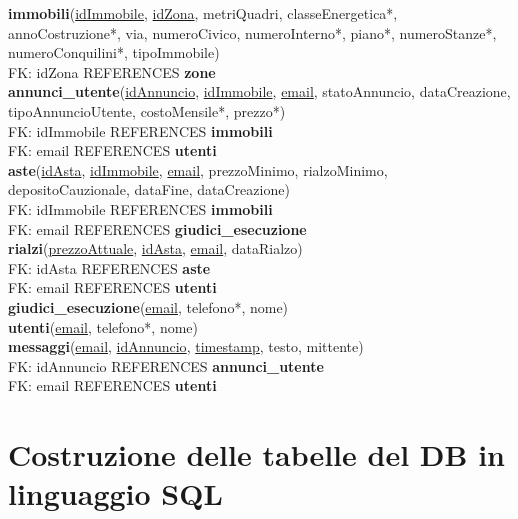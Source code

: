 \documentclass[a4paper,12pt]{report}
\begin{document}
        \textbf{immobili}(\underline{idImmobile}, \underline{idZona}, metriQuadri, classeEnergetica*, annoCostruzione*, via, numeroCivico, numeroInterno*, piano*, numeroStanze*, numeroConquilini*, tipoImmobile) \\
            \null\quad\quad FK: idZona REFERENCES \textbf{zone} \\
        \textbf{annunci\_utente}(\underline{idAnnuncio}, \underline{idImmobile}, \underline{email}, statoAnnuncio, dataCreazione, tipoAnnuncioUtente, costoMensile*, prezzo*) \\
            \null\quad\quad FK: idImmobile REFERENCES \textbf{immobili} \\
            \null\quad\quad FK: email REFERENCES \textbf{utenti} \\
        \newpage
        \noindent
        \textbf{aste}(\underline{idAsta}, \underline{idImmobile}, \underline{email}, prezzoMinimo, rialzoMinimo, depositoCauzionale, dataFine, dataCreazione) \\
            \null\quad\quad FK: idImmobile REFERENCES \textbf{immobili} \\
            \null\quad\quad FK: email REFERENCES \textbf{giudici\_esecuzione} \\
        \textbf{rialzi}(\underline{prezzoAttuale}, \underline{idAsta}, \underline{email}, dataRialzo) \\
            \null\quad\quad FK: idAsta REFERENCES \textbf{aste} \\
            \null\quad\quad FK: email REFERENCES \textbf{utenti} \\
        \textbf{giudici\_esecuzione}(\underline{email}, telefono*, nome) \\
        \textbf{utenti}(\underline{email}, telefono*, nome) \\
        \textbf{messaggi}(\underline{email}, \underline{idAnnuncio}, \underline{timestamp}, testo, mittente) \\
            \null\quad\quad FK: idAnnuncio REFERENCES \textbf{annunci\_utente} \\
            \null\quad\quad FK: email REFERENCES \textbf{utenti} \\
        	

            \section{Costruzione delle tabelle del DB in linguaggio SQL}
                
\end{document}
